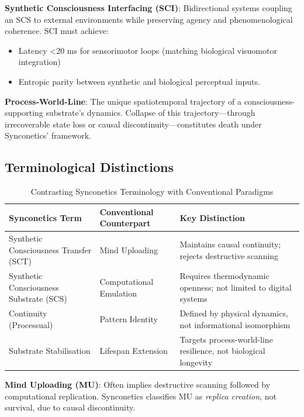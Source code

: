 \documentclass[10pt]{article}
\begin{document}
\begin{sloppypar}
  \textbf{Synthetic Consciousness Interfacing (SCI)}: Bidirectional systems coupling an SCS to external environments while preserving agency and phenomenological coherence. SCI must achieve:
  \begin{itemize}
    \item Latency <20 ms for sensorimotor loops (matching biological visuomotor integration)
    \item Entropic parity between synthetic and biological perceptual inputs.
  \end{itemize}

  \textbf{Process-World-Line}: The unique spatiotemporal trajectory of a consciousness-supporting substrate’s dynamics. Collapse of this trajectory—through irrecoverable state loss or causal discontinuity—constitutes death under Synconetics’ framework.

  \subsection{Terminological Distinctions}
  \begin{table}[ht]
    \centering
    \caption{Contrasting Synconetics Terminology with Conventional Paradigms}
    \begin{tabular}{p{}p{}p{}}
      \toprule
      \textbf{Synconetics Term}               & \textbf{Conventional Counterpart} & \textbf{Key Distinction}                                        \\
      \midrule
      Synthetic Consciousness Transfer (SCT)  & Mind Uploading                    & Maintains causal continuity; rejects destructive scanning       \\
      Synthetic Consciousness Substrate (SCS) & Computational Emulation           & Requires thermodynamic openness; not limited to digital systems \\
      Continuity (Processual)                 & Pattern Identity                  & Defined by physical dynamics, not informational isomorphism     \\
      Substrate Stabilisation                 & Lifespan Extension                & Targets process-world-line resilience, not biological longevity \\
      \bottomrule
    \end{tabular}
    \label{tab:terminology}
  \end{table}

  \textbf{Mind Uploading (MU)}: Often implies destructive scanning followed by computational replication. Synconetics classifies MU as \textit{replica creation}, not survival, due to causal discontinuity.


\end{sloppypar}
\end{document}
